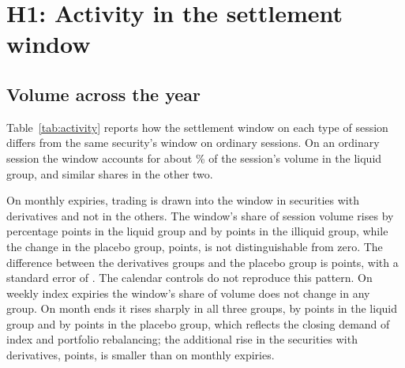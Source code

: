 \section{H1: Activity in the settlement window}\label{sec:activity}

\subsection{Volume across the year}\label{sec:window}

Table~\ref{tab:activity} reports how the settlement window on each type of session differs
from the same security's window on ordinary sessions. On an ordinary session the window
accounts for about \ActWindowshareLiquidNormal{}\% of the session's volume in the liquid
group, and similar shares in the other two.

\begin{table}[htbp]
\centering
\small
\caption{Activity in the settlement window by type of session. Each entry is the coefficient
on an indicator for the session type in a regression with security fixed effects, estimated
separately for each group, and measures the difference from ordinary sessions of the same
security. The last column is the difference between the securities with derivatives and the
placebo group, estimated with security and session fixed effects. Standard errors clustered
by session in parentheses. $^{*}$, $^{**}$ and $^{***}$ denote significance at the ten, five
and one per cent levels.}
\label{tab:activity}
\resizebox{\textwidth}{!}{}
\end{table}

On monthly expiries, trading is drawn into the window in securities with derivatives and not
in the others. The window's share of session volume rises by \ActWindowshareLiquidMonthlyexpiry{}
percentage points in the liquid group and by \ActWindowshareIlliquidMonthlyexpiry{} points
in the illiquid group, while the change in the placebo group, \ActWindowsharePlaceboMonthlyexpiry{}
points, is not distinguishable from zero. The difference between the derivatives groups and
the placebo group is \ActWindowshareDidMonthlyexpiry{} points, with a standard error of
\ActWindowshareDidMonthlyexpirySe{}. The calendar controls do not reproduce this pattern. On weekly
index expiries the window's share of volume does not change in any group. On month ends it
rises sharply in all three groups, by \ActWindowshareLiquidMonthend{} points in the liquid
group and by \ActWindowsharePlaceboMonthend{} points in the placebo group, which reflects the
closing demand of index and portfolio rebalancing; the additional rise in the securities with
derivatives, \ActWindowshareDidMonthend{} points, is smaller than on monthly expiries.

